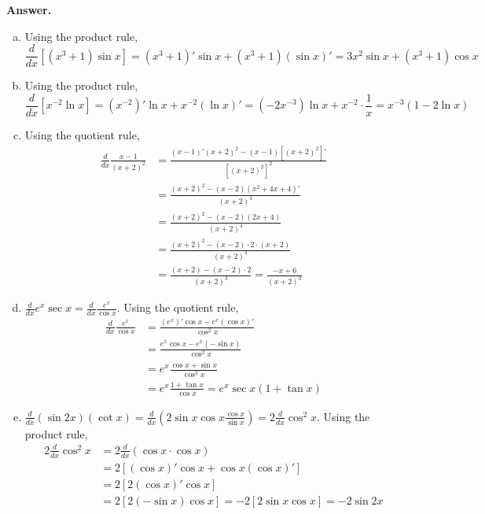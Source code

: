 \documentclass[11pt,letterpaper]{article}
\newcommand{\answer}{\noindent \textbf{Answer. }}
\begin{document}
\answer
\begin{enumerate}[(a)]
    \item Using the product rule, 
    \[\frac{d}{dx} \left[(x^3+1) \sin x \right] = (x^3+1)' \sin x + (x^3+1) (\sin x)' = 3 x^2 \sin x + (x^3 + 1) \cos x\]
    \item Using the product rule, 
    \[\frac{d}{dx} \left[ x^{-2} \ln x \right]= (x^{-2})' \ln x + x^{-2} (\ln x)' = (-2x^{-3}) \ln x + x^{-2} \cdot \frac{1}{x} = x^{-3} (1-2 \ln x)\]
    \item Using the quotient rule, 
    \begin{align*}
        \frac{d}{dx} \frac{x-1}{(x+2)^2} &= \frac{(x-1)' (x+2)^2 - (x-1)\left[(x+2)^2\right]'}{[(x+2)^2]^2} \\
        &= \frac{(x+2)^2 - (x-2) (x^2+4x+4)'}{(x+2)^4} \\
        &= \frac{(x+2)^2 - (x-2) (2x+4)}{(x+2)^4} \\
        &= \frac{(x+2)^2 - (x-2) \cdot 2 \cdot (x+2)}{(x+2)^4} \\
        &= \frac{(x+2) - (x-2) \cdot 2}{(x+2)^3} = \frac{-x+6}{(x+2)^3}
    \end{align*}
    \item $\frac{d}{dx}e^x \sec x = \frac{d}{dx}\frac{e^x}{\cos x}$. Using the quotient rule,
    \begin{align*}
        \frac{d}{dx} \frac{e^x}{\cos x} &= \frac{(e^x)' \cos x - e^x(\cos x)'}{\cos^2 x} \\
        &= \frac{e^x \cos x - e^x (-\sin x)}{\cos^2 x} \\
        &= e^x\frac{\cos x + \sin x}{\cos^2 x} \\
        &= e^x\frac{1 + \tan x}{\cos x} = e^x \sec x(1 + \tan x)
    \end{align*}
    \item $\frac{d}{dx}(\sin 2x) (\cot x) = \frac{d}{dx} \left(2 \sin x \cos x \frac{\cos x}{\sin x}\right) = 2\frac{d}{dx} \cos^2 x$.  Using the product rule,
    \begin{align*}
        2\frac{d}{dx} \cos^2 x &= 2\frac{d}{dx}(\cos x \cdot \cos x) \\
        &= 2 \left[(\cos x)' \cos x + \cos x (\cos x)'\right] \\
        &= 2 \left[2(\cos x)' \cos x\right]\\
        &= 2\left[2(- \sin x) \cos x\right] = -2\left[2 \sin x \cos x\right] = -2\sin 2x
    \end{align*}
\end{enumerate}\vspace{6mm}
\end{document}
